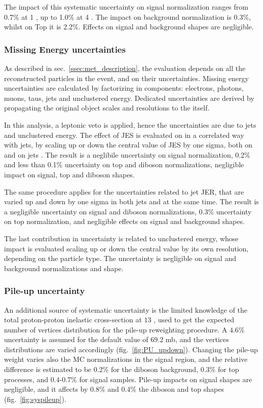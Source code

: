 \noindent The impact of this systematic uncertainty on signal normalization ranges from 0.7\% at 1 \TeV, up to 1.0\% at 4 \TeV. The impact on \VV background normalization is 0.3\%, whilst on Top it is 2.2\%. Effects on signal and background shapes are negligible.

\subsubsection{Missing Energy uncertainties}
\label{metuncsec}
As described in sec.~\ref{ssec:met_description}, the \MET evaluation depends on all the reconstructed particles in the event, and on their uncertainties. Missing energy uncertainties are calculated by factorizing \met in components: electrons, photons, muons, taus, jets and unclustered energy. Dedicated uncertainties are derived by propagating the original object scales and resolutions to the \MET itself.

\noindent In this analysis, a leptonic veto is applied, hence the \MET uncertainties are due to jets and unclustered energy. The effect of JES is evaluated on \MET in a correlated way with jets, by scaling up or down the central value of JES by one sigma, both on \MET and on jets \pt. The result is a neglibile uncertainty on signal normalization, 0.2\% and less than 0.1\% uncertainty on top and diboson normalizations, negligible impact on signal, top and diboson shapes.

\noindent The same procedure applies for the uncertainties related to jet JER, that are varied up and down by one sigma in both jets and \met at the same time. The result is a negligible uncertainty on signal and diboson normalizations, 0.3\% uncertainty on top normalization, and negligible effects on signal and background shapes.

\noindent The last contribution in \MET uncertainty is related to unclustered energy, whose impact is evaluated scaling up or down the central value by its own resolution, depending on the particle type. The uncertainty is negligible on signal and background normalizations and shape.

\subsubsection{Pile-up uncertainty}
An additional source of systematic uncertainty is the limited knowledge of the total proton-proton inelastic cross-section at $13$ \TeV, used to get the expected number of vertices distribution for the pile-up reweighting procedure. A $4.6\%$ uncertainty is assumed for the default value of $69.2$ mb, and the vertices distributions are varied accordingly (fig.~\ref{fig:PU_updown}). Changing the pile-up weight varies also the MC normalizations in the signal region, and the relative difference is estimated to be 0.2\% for the diboson background, 0.3\% for top processes, and 0.4-0.7\% for signal samples. Pile-up impacts on signal shapes are negligible, and it affects by 0.8\% and 0.4\% the diboson and top shapes (fig.~\ref{fig:syspileup}). %

